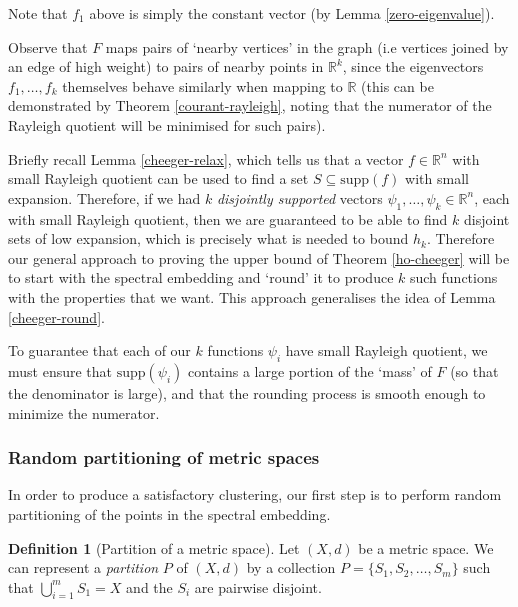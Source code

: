 \documentclass[a4paper,11pt]{article}
\theoremstyle{definition}
\newtheorem{definition}[theorem]{Definition}
\newcommand{\R}{\mathbb{R}}
\newcommand{\supp}[1]{\mathrm{supp}\left(#1\right)}
\begin{document}
Note that $f_1$ above is simply the constant vector (by Lemma \ref{zero-eigenvalue}).

\medskip

Observe that $F$ maps pairs of `nearby vertices' in the graph (i.e vertices joined by an edge of high weight) to pairs of nearby points in $\R^k$, since the eigenvectors $f_1, \dots, f_k$ themselves behave similarly when mapping to $\R$ (this can be demonstrated by Theorem \ref{courant-rayleigh}, noting that the numerator of the Rayleigh quotient will be minimised for such pairs).

Briefly recall Lemma \ref{cheeger-relax}, which tells us that a vector $f \in \R^n$ with small Rayleigh quotient can be used to find a set $S \subseteq \supp{f}$ with small expansion. Therefore, if we had $k$ \emph{disjointly supported} vectors $\psi_1, \dots, \psi_k \in \R^n$, each with small Rayleigh quotient, then we are guaranteed to be able to find $k$ disjoint sets of low expansion, which is precisely what is needed to bound $h_k$. Therefore our general approach to proving the upper bound of Theorem \ref{ho-cheeger} will be to start with the spectral embedding and `round' it to produce $k$ such functions with the properties that we want. This approach generalises the idea of Lemma \ref{cheeger-round}.

\medskip

To guarantee that each of our $k$ functions $\psi_i$ have small Rayleigh quotient, we must ensure that $\supp{\psi_i}$ contains a large portion of the `mass' of $F$ (so that the denominator is large), and that the rounding process is smooth enough to minimize the numerator.

\subsubsection{Random partitioning of metric spaces}

In order to produce a satisfactory clustering, our first step is to perform random partitioning of the points in the spectral embedding.

\begin{definition}[Partition of a metric space]
Let $(X, d)$ be a metric space. We can represent a \emph{partition} $P$ of $(X, d)$ by a collection $P = \{S_1, S_2, \dots, S_m\}$ such that $\bigcup_{i=1}^m S_1 = X$ and the $S_i$ are pairwise disjoint.

\end{definition}
\end{document}

